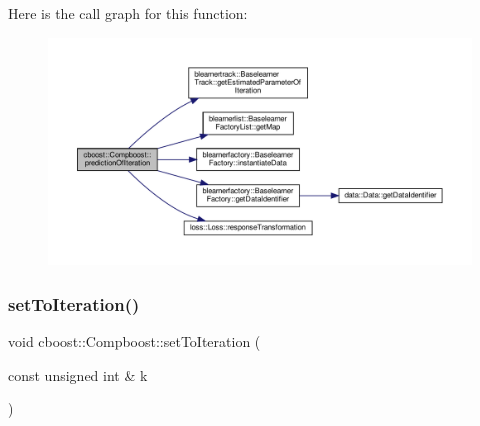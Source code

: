 Here is the call graph for this function\+:
\nopagebreak
\begin{figure}[H]
\begin{center}
\leavevmode
\includegraphics[width=350pt]{classcboost_1_1_compboost_abd00401a8914cde27a93673e12ab3468_cgraph}
\end{center}
\end{figure}
\mbox{\label{classcboost_1_1_compboost_ad1ee3b88f585f38255d827dceb4b7659}} 
\subsubsection{\texorpdfstring{set\+To\+Iteration()}{setToIteration()}}
{\footnotesize\ttfamily void cboost\+::\+Compboost\+::set\+To\+Iteration (\begin{DoxyParamCaption}\item[{const unsigned int \&}]{k }\end{DoxyParamCaption})}

